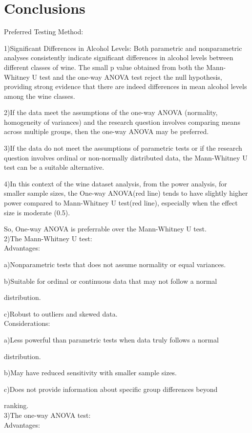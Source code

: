 \documentclass{article}
\begin{document}
\section{Conclusions}
Preferred Testing Method:

1)Significant Differences in Alcohol Levels: Both parametric and nonparametric analyses consistently indicate significant differences in alcohol levels between different classes of wine. The small p value obtained from both the Mann-Whitney U test and the one-way ANOVA test reject the null hypothesis, providing strong evidence that there are indeed differences in mean alcohol levels among the wine classes.

2)If the data meet the assumptions of the one-way ANOVA (normality, homogeneity of variances) and the research question involves comparing means across multiple groups, then the one-way ANOVA may be preferred.

3)If the data do not meet the assumptions of parametric tests or if the research question involves ordinal or non-normally distributed data, the Mann-Whitney U test can be a suitable alternative.

4)In this context of the wine dataset analysis, from the power analysis, for smaller sample sizes, the One-way ANOVA(red line) tends to have slightly higher power compared to Mann-Whitney U test(red line), especially when the effect size is moderate (0.5).

So, One-way ANOVA is preferrable over the Mann-Whitney U test. 
\\2)The Mann-Whitney U test: 
\\Advantages:

a)Nonparametric tests that does not assume normality or equal variances.

b)Suitable for ordinal or continuous data that may not follow a normal 

distribution.

c)Robust to outliers and skewed data.
\\Considerations:

a)Less powerful than parametric tests when data truly follows a normal 

distribution.

b)May have reduced sensitivity with smaller sample sizes.

c)Does not provide information about specific group differences beyond 

ranking.
\\3)The one-way ANOVA test: 
\\Advantages:
\end{document}
